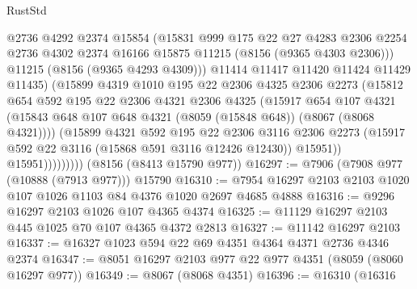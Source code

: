 \begin{lexlean}{RustStd}
\begin{coremodule}
                        @2736
                        @4292
                        @2374
                        @15854
                        (@15831
                          @999
                          @175
                          @22
                          @27
                          @4283
                          @2306
                          @2254
                          @2736
                          @4302
                          @2374
                          @16166
                          @15875
                          @11215
                          (@8156 (@9365 @4303 @2306)))
                        @11215
                        (@8156 (@9365 @4293 @4309)))
                      @11414
                      @11417
                      @11420
                      @11424
                      @11429
                      @11435)
                    (@15899
                      @4319
                      @1010
                      @195
                      @22
                      @2306
                      @4325
                      @2306
                      @2273
                      (@15812
                        @654
                        @592
                        @195
                        @22
                        @2306
                        @4321
                        @2306
                        @4325
                        (@15917
                          @654
                          @107
                          @4321
                          (@15843 @648 @107 @648 @4321 (@8059 (@15848 @648)) (@8067 (@8068 @4321))))
                        (@15899
                          @4321
                          @592
                          @195
                          @22
                          @2306
                          @3116
                          @2306
                          @2273
                          (@15917 @592 @22 @3116 (@15868 @591 @3116 @12426 @12430))
                          @15951))
                      @15951)))))))))
    (@8156 (@8413 @15790 @977))
@16297 := @7906 (@7908 @977 (@10888 (@7913 @977))) @15790
@16310 := @7954 @16297 @2103 @2103 @1020 @107 @1026 @1103 @84 @4376 @1020 @2697 @4685 @4888
@16316 := @9296 @16297 @2103 @1026 @107 @4365 @4374
@16325 := @11129 @16297 @2103 @445 @1025 @70 @107 @4365 @4372 @2813
@16327 := @11142 @16297 @2103
@16337 := @16327 @1023 @594 @22 @69 @4351 @4364 @4371 @2736 @4346 @2374
@16347 := @8051 @16297 @2103 @977 @22 @977 @4351 (@8059 (@8060 @16297 @977))
@16349 := @8067 (@8068 @4351)
@16396 := @16310
    (@16316

\end{coremodule}
\end{lexlean}
